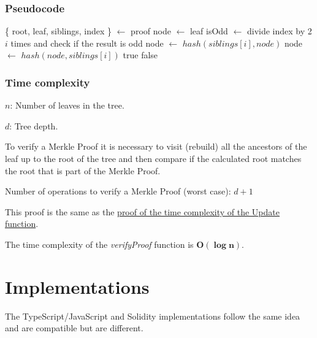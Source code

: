 \documentclass{article}
\begin{document}
\subsubsection{Pseudocode}

\begin{algorithm}[H]
    \caption{LeanIMT verifyProof algorithm}\label{verifyProof}
    \begin{algorithmic}[1]
        \State \{ root, leaf, siblings, index \} $\gets$ proof 
        \State node $\gets$ leaf
        \State isOdd $\gets$ divide index by 2 $i$ times and check if the result is odd
         
        \State node $\gets$ $hash(siblings[i], node)$
        \Else {}
        \State node $\gets$ $hash(node, siblings[i])$
        \EndIf
        \EndFor
        \State \Return true
        \Else
        \State \Return false
        \EndIf
        \EndProcedure
    \end{algorithmic}
\end{algorithm}


\subsubsection{Time complexity}

$n$: Number of leaves in the tree.

$d$: Tree depth.

To verify a Merkle Proof it is necessary to visit (rebuild) all the ancestors of the leaf up to the root of the tree and then compare if the calculated root matches the root that is part of the Merkle Proof.

Number of operations to verify a Merkle Proof (worst case): $d + 1$

This proof is the same as the \hyperref[UpdateTimeComplexity]{proof of the time complexity of the Update function}.

The time complexity of the \textit{verifyProof} function is $\boldsymbol{O(\log n)}$.


\section{Implementations}

The TypeScript/JavaScript and Solidity implementations follow the same idea and are compatible but are different.
\end{document}
